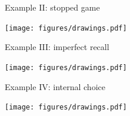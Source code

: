 \begin{frame}{Example II: stopped game}
	\begin{center}
		\texttt{[image: figures/drawings.pdf]}
	\end{center}
\end{frame}

\begin{frame}{Example III: imperfect recall}
	\begin{center}
		\texttt{[image: figures/drawings.pdf]}
	\end{center}
\end{frame}

\begin{frame}{Example IV: internal choice}
	\begin{center}
		\texttt{[image: figures/drawings.pdf]}
	\end{center}
\end{frame}
